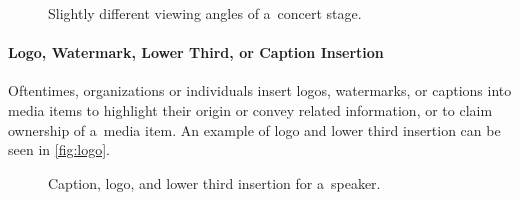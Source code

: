 \begin{figure}[h!]
  \centering
  \caption{Slightly different viewing angles of a~concert stage.}
  \label{fig:viewing-angle}  
\end{figure}

\paragraph{Logo, Watermark, Lower Third, or Caption Insertion}

Oftentimes, organizations or individuals insert
logos, watermarks, or captions into media items
to highlight their origin or convey related information,
or to claim ownership of a~media item.
An example of logo and lower third insertion
can be seen in \autoref{fig:logo}.

\begin{figure}[h!]
  \centering
  \caption{Caption, logo, and lower third insertion for a~speaker.}
  \label{fig:logo}  
\end{figure}

